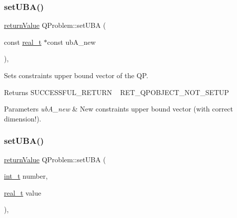 \subsubsection{\texorpdfstring{set\+U\+B\+A()}{setUBA()}\hspace{0.1cm}{\footnotesize\ttfamily [1/2]}}
{\footnotesize\ttfamily \hyperlink{_message_handling_8hpp_a81d556f613bfbabd0b1f9488c0fa865e}{return\+Value} Q\+Problem\+::set\+U\+BA (\begin{DoxyParamCaption}\item[{const \hyperlink{qp_o_a_s_e_s__wrapper_8h_a0d00e2b3dfadee81331bbb39068570c4}{real\+\_\+t} $\ast$const}]{ub\+A\+\_\+new }\end{DoxyParamCaption})\hspace{0.3cm}{\ttfamily [inline]}, {\ttfamily [protected]}}

Sets constraints\textquotesingle{} upper bound vector of the QP. \begin{DoxyReturn}{Returns}
S\+U\+C\+C\+E\+S\+S\+F\+U\+L\+\_\+\+R\+E\+T\+U\+RN ~\newline
 R\+E\+T\+\_\+\+Q\+P\+O\+B\+J\+E\+C\+T\+\_\+\+N\+O\+T\+\_\+\+S\+E\+T\+UP 
\end{DoxyReturn}

\begin{DoxyParams}{Parameters}
{\em ub\+A\+\_\+new} & New constraints\textquotesingle{} upper bound vector (with correct dimension!). \\
\hline
\end{DoxyParams}
\mbox{\label{class_q_problem_a2eba1b16295d6e46dbd464274495f5bb}} 
\subsubsection{\texorpdfstring{set\+U\+B\+A()}{setUBA()}\hspace{0.1cm}{\footnotesize\ttfamily [2/2]}}
{\footnotesize\ttfamily \hyperlink{_message_handling_8hpp_a81d556f613bfbabd0b1f9488c0fa865e}{return\+Value} Q\+Problem\+::set\+U\+BA (\begin{DoxyParamCaption}\item[{\hyperlink{_types_8hpp_ab6fd6105e64ed14a0c9281326f05e623}{int\+\_\+t}}]{number,  }\item[{\hyperlink{qp_o_a_s_e_s__wrapper_8h_a0d00e2b3dfadee81331bbb39068570c4}{real\+\_\+t}}]{value }\end{DoxyParamCaption})\hspace{0.3cm}{\ttfamily [inline]}, {\ttfamily [protected]}}

